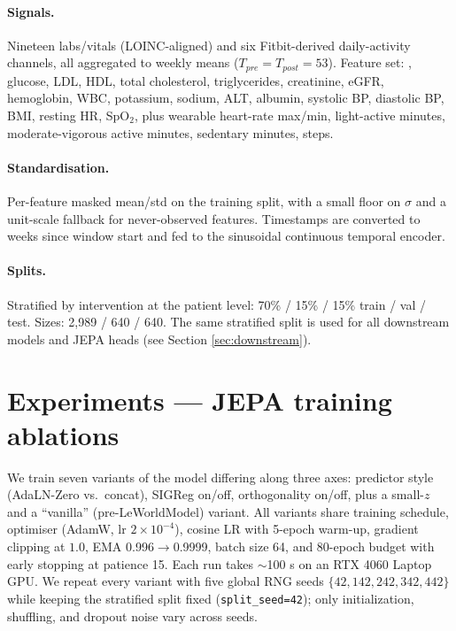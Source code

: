\paragraph{Signals.} Nineteen labs/vitals (LOINC-aligned) and six
Fitbit-derived daily-activity channels, all aggregated to weekly means
($T_{pre} = T_{post} = 53$). Feature set: \hba{}, glucose, LDL, HDL, total
cholesterol, triglycerides, creatinine, eGFR, hemoglobin, WBC,
potassium, sodium, ALT, albumin, systolic BP, diastolic BP, BMI,
resting HR, SpO$_2$, plus wearable heart-rate max/min, light-active
minutes, moderate-vigorous active minutes, sedentary minutes, steps.

\paragraph{Standardisation.} Per-feature masked mean/std on the training
split, with a small floor on $\sigma$ and a unit-scale fallback for
never-observed features. Timestamps are converted to weeks since window
start and fed to the sinusoidal continuous temporal encoder.

\paragraph{Splits.} Stratified by intervention at the patient level:
70\% / 15\% / 15\% train / val / test. Sizes: 2{,}989 / 640 / 640. The
same stratified split is used for all downstream models and JEPA heads
(see Section \ref{sec:downstream}).

\section{Experiments --- JEPA training ablations}
\label{sec:ablations}

We train seven variants of the model differing along three axes:
predictor style (AdaLN-Zero vs.\ concat), SIGReg on/off, orthogonality
on/off, plus a small-$z$ and a ``vanilla'' (pre-LeWorldModel) variant.
All variants share training schedule, optimiser (AdamW, lr $2{\times}10^{-4}$),
cosine LR with 5-epoch warm-up, gradient clipping at $1.0$,
EMA 0.996$\to$0.9999, batch size 64, and 80-epoch budget with
early stopping at patience 15. Each run takes $\sim$100 s on an
RTX 4060 Laptop GPU.
We repeat every variant with five global RNG seeds
$\{42,142,242,342,442\}$ while keeping the stratified split fixed
(\texttt{split\_seed=42}); only initialization, shuffling, and dropout
noise vary across seeds.

